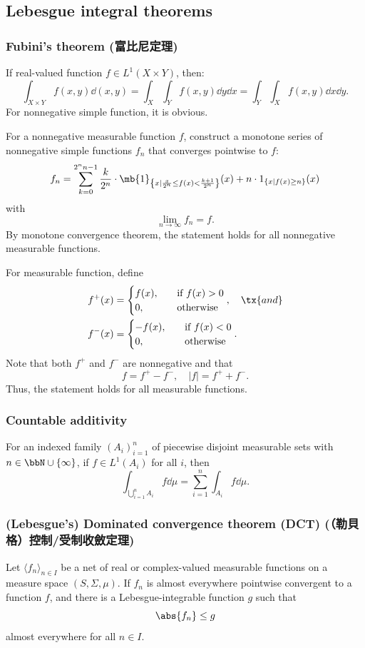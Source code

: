 \documentclass[a4paper,12pt]{report}
\begin{document}
\begin{itemize}
\begin{itemize}
\subsection{Lebesgue integral theorems}
\subsubsection{Fubini's theorem (富比尼定理)}
If real-valued function $f\in L^1(X\times Y)$, then:
\[\int_{X\times Y}f(x,y)\dd{(x,y)}=\int_X\int_Yf(x,y)\dd{y}\dd{x}=\int_Y\int_Xf(x,y)\dd{x}\dd{y}.\]
\bpr
For nonnegative simple function, it is obvious.

For a nonnegative measurable function $f$, construct a monotone series of nonnegative simple functions $f_n$ that converges pointwise to $f$:
\[f_n=\sum_{k=0}^{2^nn-1}\frac{k}{2^n}\cdot\mb{1}_{\left\{x\mid\frac{x}{2^n}\le f(x)<\frac{k+1}{2^n}\right\}}(x)+n\cdot 1_{\{x\mid f(x)\ge n\}}(x)\]
with
\[\lim_{n\to\infty}f_n=f.\]
By monotone convergence theorem, the statement holds for all nonnegative measurable functions.

For measurable function, define
\[\begin{aligned}
f^{+}(x)&=
\begin{cases}
f(x),\quad&\text{if\ }f(x)>0\\
0,\quad &\text{otherwise}
\end{cases},\quad\tx{and}\\
f^{-}(x)&=
\begin{cases}
-f(x),\quad&\text{if\ }f(x)<0\\
0,\quad&\text{otherwise}
\end{cases}.
\end{aligned}\]
Note that both $f^+$ and $f^-$ are nonnegative and that
\[f=f^+-f^-,\quad |f|=f^++f^-.\]
Thus, the statement holds for all measurable functions.
\epr
\subsubsection{Countable additivity}
For an indexed family $(A_i)_{i=1}^n$ of piecewise disjoint measurable sets with $n\in\bbN\cup\{\infty\}$, if $f\in L^1(A_i)$ for all $i$, then
\[\int_{\bigcup_{i=1}^nA_i}f\dd{\mu}=\sum_{i=1}^n\int_{A_i}f\dd{\mu}.\]
\subsubsection{(Lebesgue's) Dominated convergence theorem (DCT) (（勒貝格）控制/受制收斂定理)}
Let $\langle f_n\rangle_{n\in I}$ be a net of real or complex-valued measurable functions on a measure space $(S,\Sigma,\mu)$. If $f_n$ is almost everywhere pointwise convergent to a function $f$, and there is a Lebesgue-integrable function $g$ such that
\[\abs{f_n}\leq g\]
almost everywhere for all $n\in I$.


\end{itemize}
\end{itemize}
\end{document}

